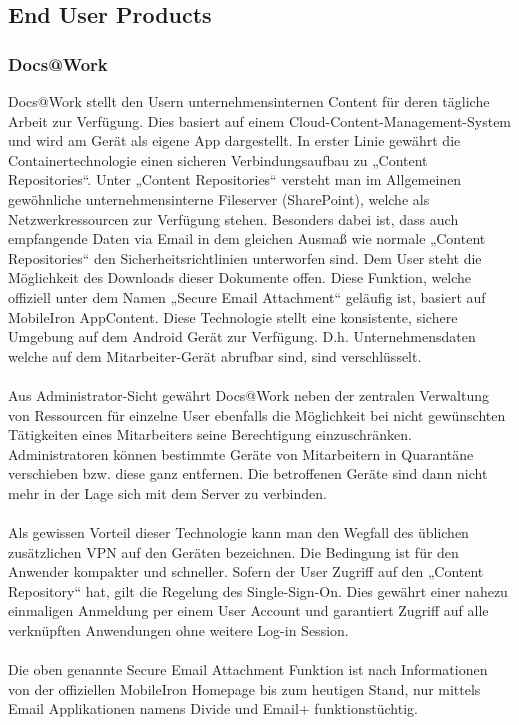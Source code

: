 \subsection{End User Products}
\subsubsection{Docs@Work}
Docs@Work stellt den Usern unternehmensinternen Content für deren tägliche Arbeit zur Verfügung. Dies basiert auf einem Cloud-Content-Management-System und wird am Gerät als eigene App dargestellt. In erster Linie gewährt die Containertechnologie einen sicheren Verbindungsaufbau zu „Content Repositories“. Unter „Content Repositories“ versteht man im Allgemeinen gewöhnliche unternehmensinterne Fileserver (SharePoint), welche als Netzwerkressourcen zur Verfügung stehen. Besonders dabei ist, dass auch empfangende Daten via Email in dem gleichen Ausmaß wie normale „Content Repositories“ den Sicherheitsrichtlinien unterworfen sind. Dem User steht die Möglichkeit des Downloads dieser Dokumente offen. Diese Funktion, welche offiziell unter dem Namen „Secure Email Attachment“ geläufig ist, basiert auf MobileIron AppContent. Diese Technologie stellt eine konsistente, sichere Umgebung auf dem Android Gerät zur Verfügung. D.h. Unternehmensdaten welche auf dem Mitarbeiter-Gerät abrufbar sind, sind verschlüsselt.
\paragraph*{}
Aus Administrator-Sicht gewährt Docs@Work neben der zentralen Verwaltung von Ressourcen für einzelne User ebenfalls die Möglichkeit bei nicht gewünschten Tätigkeiten eines Mitarbeiters seine Berechtigung einzuschränken. Administratoren können bestimmte Geräte von Mitarbeitern in Quarantäne verschieben bzw. diese ganz entfernen. Die betroffenen Geräte sind dann nicht mehr in der Lage sich mit dem Server zu verbinden.
\paragraph*{}
Als gewissen Vorteil dieser Technologie kann man den Wegfall des üblichen zusätzlichen VPN auf den Geräten bezeichnen. Die Bedingung ist für den Anwender kompakter und schneller. Sofern der User Zugriff auf den „Content Repository“ hat, gilt die Regelung des Single-Sign-On. Dies gewährt einer nahezu einmaligen Anmeldung per einem User Account und garantiert Zugriff auf alle verknüpften Anwendungen ohne weitere Log-in Session.
\paragraph*{}
Die oben genannte Secure Email Attachment Funktion ist nach Informationen von der offiziellen MobileIron Homepage bis zum heutigen Stand, nur mittels Email Applikationen namens Divide und Email+ funktionstüchtig.
